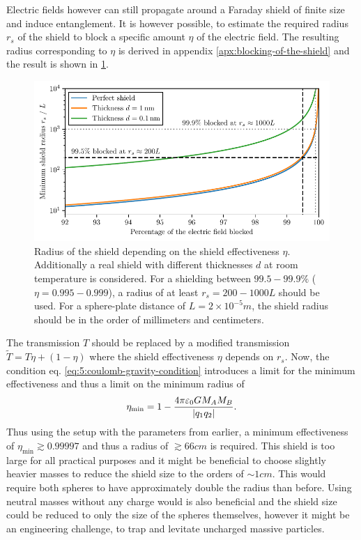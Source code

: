 Electric fields however can still propagate around a Faraday shield of finite size and induce entanglement. It is however possible, to estimate the required radius $r_s$ of the shield to block a specific amount $\eta$ of the electric field.
The resulting radius corresponding to $\eta$ is derived in appendix \ref{apx:blocking-of-the-shield} and the result is shown in \cref{fig:5:shield-radius}.
\begin{figure}[!ht]
  \centering
  \includegraphics[width=\textwidth]{./../figures/others/shield-radius.pdf}
  \caption{Radius of the shield depending on the shield effectiveness $\eta$. Additionally a real shield with different thicknesses $d$ at room temperature is considered. For a shielding between $99.5-99.9\%$ ($\eta = 0.995-0.999$), a radius of at least $r_s =200-1000L$ should be used. For a sphere-plate distance of $L=2 \times 10^{-5}\si{m}$, the shield radius should be in the order of millimeters and centimeters.}
  \label{fig:5:shield-radius}
\end{figure}
The transmission $T$ should be replaced by a modified transmission $\tilde{T} = T\eta + (1-\eta)$ where the shield effectiveness $\eta$ depends on $r_s$. 
Now, the condition eq. \eqref{eq:5:coulomb-gravity-condition} introduces a limit for the minimum effectiveness and thus a limit on the minimum radius of
\begin{equation}
  \eta_\mathrm{min} = 1 - \frac{4\pi \varepsilon_0 G M_A M_B}{\left\lvert q_1 q_2\right\rvert} .
\end{equation}
Thus using the setup with the parameters from earlier, a minimum effectiveness of $\eta_\mathrm{min} \gtrsim 0.99997$ and thus a radius of $\gtrsim 66\si{cm}$ is required.
This shield is too large for all practical purposes and it might be beneficial to choose slightly heavier masses to reduce the shield size to the orders of $\sim 1\si{cm}$. This would require both spheres to have approximately double the radius than before.
Using neutral masses without any charge would is also beneficial and the shield size could be reduced to only the size of the spheres themselves, however it might be an engineering challenge, to trap and levitate uncharged massive particles.






